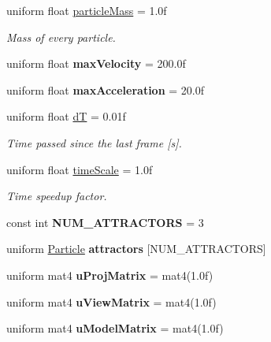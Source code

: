 \begin{DoxyCompactItemize}
\mbox{\label{particle__attraction_8comp_a6fdfc6d0da52cba2f32086c736e010eb}} 
uniform float \hyperlink{particle__attraction_8comp_a6fdfc6d0da52cba2f32086c736e010eb}{particle\+Mass} = 1.\+0f
\begin{DoxyCompactList}\small\item\em Mass of every particle. \end{DoxyCompactList}\item 
\mbox{\label{particle__attraction_8comp_a04760c9ca79b8e96e8cf26241a0ed6d5}} 
uniform float {\bfseries max\+Velocity} = 200.\+0f
\item 
\mbox{\label{particle__attraction_8comp_a95d3a39252e2b1afbe84408dd7bf7862}} 
uniform float {\bfseries max\+Acceleration} = 20.\+0f
\item 
\mbox{\label{particle__attraction_8comp_afa6fb72b63888e1e0999df05216df22c}} 
uniform float \hyperlink{particle__attraction_8comp_afa6fb72b63888e1e0999df05216df22c}{dT} = 0.\+01f
\begin{DoxyCompactList}\small\item\em Time passed since the last frame \mbox{[}s\mbox{]}. \end{DoxyCompactList}\item 
\mbox{\label{particle__attraction_8comp_ada8995d196db18c951ef5fe8de204a08}} 
uniform float \hyperlink{particle__attraction_8comp_ada8995d196db18c951ef5fe8de204a08}{time\+Scale} = 1.\+0f
\begin{DoxyCompactList}\small\item\em Time speedup factor. \end{DoxyCompactList}\item 
\mbox{\label{particle__attraction_8comp_a634978067ef4e719818cfc454cf3bebe}} 
const int {\bfseries N\+U\+M\+\_\+\+A\+T\+T\+R\+A\+C\+T\+O\+RS} = 3
\item 
uniform \hyperlink{struct_particle}{Particle} {\bfseries attractors} \mbox{[}N\+U\+M\+\_\+\+A\+T\+T\+R\+A\+C\+T\+O\+RS\mbox{]}
\item 
\mbox{\label{particle__attraction_8comp_aca67541978560380a1679e34c3f6d9c1}} 
uniform mat4 {\bfseries u\+Proj\+Matrix} = mat4(1.\+0f)
\item 
\mbox{\label{particle__attraction_8comp_a64898a8ba6f72a913fe53c32a9be727f}} 
uniform mat4 {\bfseries u\+View\+Matrix} = mat4(1.\+0f)
\item 
\mbox{\label{particle__attraction_8comp_ad5bad8c011aa3081478f3441a9de71c6}} 
uniform mat4 {\bfseries u\+Model\+Matrix} = mat4(1.\+0f)
\end{DoxyCompactItemize}


